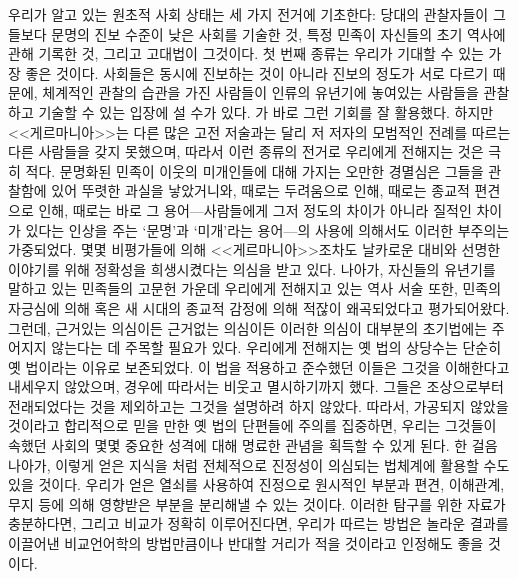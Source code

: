 우리가 알고 있는 원초적 사회 상태는 세 가지 전거에 기초한다:
\hypertarget{contemporary}{당대의}
관찰자들이 그들보다 문명의 진보 수준이 낮은 사회를 기술한 것,
특정 민족이 자신들의 초기 역사에 관해 기록한 것,
그리고 고대법이 그것이다.
첫 번째 종류는 우리가 기대할 수 있는 가장 좋은 것이다.
사회들은 동시에 진보하는 것이 아니라 진보의 정도가 서로 다르기 때문에,
체계적인 관찰의 습관을 가진 사람들이 인류의 유년기에 놓여있는 사람들을
관찰하고 기술할 수 있는 입장에 설 수가 있다.
가 바로 그런 기회를 잘 활용했다.
하지만 <<게르마니아>>는 다른 많은 고전 저술과는 달리
저 저자의 모범적인 전례를 따르는 다른 사람들을 갖지 못했으며,
따라서 이런 종류의 전거로 우리에게 전해지는 것은 극히 적다.
문명화된 민족이 이웃의 미개인들에 대해 가지는 오만한 경멸심은
그들을 관찰함에 있어 뚜렷한 과실을 낳았거니와,
때로는 두려움으로 인해, 때로는 종교적 편견으로 인해,
때로는 바로 그 용어---사람들에게 그저 정도의 차이가 아니라 질적인 차이가
있다는 인상을 주는 `문명'과 `미개'라는
용어---의 사용에 의해서도
이러한 부주의는 가중되었다.
몇몇 비평가들에 의해
<<게르마니아>>조차도
날카로운 대비와 선명한 이야기를 위해 정확성을 희생시켰다는 의심을 받고 있다.
나아가, 자신들의 유년기를 말하고 있는 민족들의 고문헌 가운데
우리에게 전해지고 있는 역사 서술 또한,
민족의 자긍심에 의해 혹은 새 시대의 종교적 감정에 의해
적잖이 왜곡되었다고 평가되어왔다.
그런데, 근거있는 의심이든 근거없는 의심이든 이러한 의심이
대부분의 초기법에는 주어지지 않는다는 데 주목할 필요가 있다.
우리에게 전해지는 옛 법의 상당수는
단순히 옛 법이라는 이유로 보존되었다.
이 법을 적용하고 준수했던 이들은 그것을 이해한다고 내세우지 않았으며,
경우에 따라서는 비웃고 멸시하기까지 했다.
그들은 조상으로부터 전래되었다는 것을 제외하고는 그것을 설명하려 하지 않았다.
따라서, 가공되지 않았을 것이라고 합리적으로 믿을 만한 옛 법의 단편들에
주의를 집중하면, 우리는 그것들이 속했던 사회의 몇몇 중요한 성격에 대해
명료한 관념을 획득할 수 있게 된다.
한 걸음 나아가, 이렇게 얻은 지식을 처럼
전체적으로
진정성이
의심되는 법체계에 활용할 수도 있을 것이다.
우리가 얻은 열쇠를 사용하여 진정으로 원시적인 부분과
편견, 이해관계, 무지 등에 의해 영향받은 부분을 분리해낼 수 있는 것이다.
이러한 탐구를 위한 자료가 충분하다면,
그리고 비교가 정확히 이루어진다면,
우리가 따르는 방법은 놀라운 결과를 이끌어낸 비교언어학의 방법만큼이나
반대할 거리가 적을 것이라고 인정해도 좋을 것이다.

